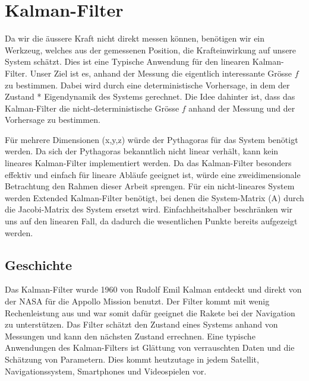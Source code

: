 %
%
%
%
%




\section{Kalman-Filter}
Da wir die äussere Kraft nicht direkt messen können, benötigen wir ein Werkzeug, welches aus der gemessenen Position, die Krafteinwirkung auf unsere System schätzt. 
Dies ist eine Typische Anwendung für den linearen Kalman-Filter.
Unser Ziel ist es, anhand der Messung die eigentlich interessante Grösse $f$ zu bestimmen. 
Dabei wird durch eine deterministische Vorhersage, in dem der Zustand * Eigendynamik des Systems gerechnet. 
Die Idee dahinter ist, dass das Kalman-Filter die nicht-deterministische Grösse $f$ anhand der Messung und der Vorhersage zu bestimmen.

Für mehrere Dimensionen (x,y,z) würde der Pythagoras für das System benötigt werden.
Da sich der Pythagoras bekanntlich nicht linear verhält, kann kein lineares Kalman-Filter implementiert werden. 
Da das Kalman-Filter besonders effektiv und einfach für lineare Abläufe geeignet ist, würde eine zweidimensionale Betrachtung den Rahmen dieser Arbeit sprengen. 
Für ein nicht-lineares System werden Extended Kalman-Filter benötigt, bei denen die System-Matrix (A) durch die Jacobi-Matrix des System ersetzt wird.
Einfachheitshalber beschränken wir uns auf den linearen Fall, da dadurch die wesentlichen Punkte bereits aufgezeigt werden. 

\subsection{Geschichte}
Das Kalman-Filter wurde 1960 von Rudolf Emil Kalman entdeckt und direkt von der NASA für die Appollo Mission benutzt. Der Filter kommt mit wenig Rechenleistung aus und war somit dafür geeignet die Rakete bei der Navigation zu unterstützen. Das Filter schätzt den Zustand eines Systems anhand von Messungen und kann den nächsten Zustand errechnen. Eine typische Anwendungen des Kalman-Filters ist Glättung von verrauschten Daten und die Schätzung von Parametern. Dies kommt heutzutage in jedem Satellit, Navigationssystem, Smartphones und Videospielen vor.

